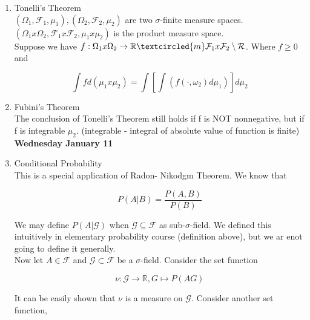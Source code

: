 \documentclass[11pt,fleqn]{book} %
\begin{document}
\begin{enumerate}
\begin{proof}
		Note that $(\Omega_1 x \Omega_2, \mathcal{F}_1 x \mathcal{F}_2, \mu_1 x \mu_2)$ is called product measure space. 
	\end{proof}

	\item Tonelli's Theorem\\

			$(\Omega_1, \mathcal{F}_1, \mu_1), (\Omega_2, \mathcal{F}_2, \mu_2)$ are two $\sigma$-finite measure spaces. \\

			$(\Omega_1 x \Omega_2, \mathcal{F}_1 x \mathcal{F}_2, \mu_1 x \mu_2)$ is the product measure space.\\

			Suppose we have $f:\Omega_1 x \Omega_2 \rightarrow \mathbb{R} \textcircled{m} \mathcal{F}_1 x \mathcal{F}_2 \setminus \mathcal{R} $. Where $f \geq 0$ and 

					$$\int f d (\mu_1 x \mu_2) =\int \left[ \int(f(\cdot, \omega_2) d\mu_1) \right] d\mu_2$$

	\item Fubini's Theorem\\

	The conclusion of Tonelli's Theorem still holds if f is NOT nonnegative, but if f is integrable $\mu_2$. (integrable - integral of absolute value of function is finite) \\

\textbf{Wednesday January 11}\\	

	\item Conditional Probability\\

	This is a special application of Radon- Nikodgm Theorem. We know that 

			$$P(A|B) = \frac{P(A, B)}{P(B)} $$

	We may define $P(A|\mathcal{G})$ when $\mathcal{G}\subseteq \mathcal{F}$ as sub-$\sigma$-field. We defined this intuitively in elementary probability course (definition above), but we ar enot going to define it generally. \\

	Now let $A \in \mathcal{F}$ and $\mathcal{G} \subset \mathcal{F}$ be a $\sigma$-field. Consider the set function 

			$$\nu: \mathcal{G} \rightarrow \mathbb{R}, G \mapsto P(AG)$$ 

	It can be easily shown that $\nu$ is a measure on $\mathcal{G}$. Consider another set function, 


\end{enumerate}
\end{document}
